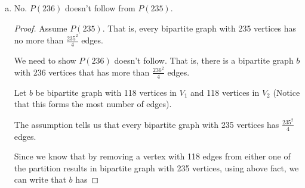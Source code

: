 \documentclass[12pt]{article}
\begin{document}
\begin{enumerate}[a.]




    \item

    No. $P(236)$ doesn't follow from $P(235)$.

    \bigskip

    \begin{proof}
        Assume $P(235)$. That is, every bipartite graph with 235 vertices has no
        more than $\frac{235^2}{4}$ edges.

        \bigskip

        We need to show $P(236)$ doesn't follow. That is, there is a bipartite graph
        $b$ with 236 vertices that has more than $\frac{236^2}{4}$ edges.

        \bigskip

        Let $b$ be bipartite graph with 118 vertices in $V_1$ and 118 vertices in
        $V_2$ (Notice that this forms the most number of edges).

        \bigskip

        The assumption tells us that every bipartite graph with 235 vertices
        has $\frac{235^2}{4}$ edges.

        \bigskip

        Since we know that by removing a vertex with 118 edges from either one
        of the partition results in bipartite graph with 235 vertices, using
        above fact, we can write that $b$ has


\end{proof}
\end{enumerate}
\end{document}
